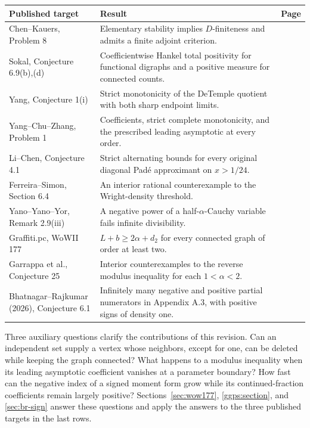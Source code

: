 \documentclass[11pt,a4paper]{article}
\theoremstyle{definition}
\theoremstyle{remark}
\numberwithin{equation}{section}
\begin{document}
\begin{center}
\small
\begin{tabular}{@{}>{\raggedright\arraybackslash}p{}>{\raggedright\arraybackslash}p{}r@{}}
\toprule
Published target & Result & Page\\
\midrule
Chen--Kauers, Problem 8 & Elementary stability implies $D$-finiteness and admits a finite adjoint criterion. & \pageref{stab:section}\\[4pt]
Sokal, Conjecture 6.9(b),(d) & Coefficientwise Hankel total positivity for functional digraphs and a positive measure for connected counts. & \pageref{sec:tp}\\[4pt]
Yang, Conjecture 1(i) & Strict monotonicity of the DeTemple quotient with both sharp endpoint limits. & \pageref{sec:yang}\\[4pt]
Yang--Chu--Zhang, Problem 1 & Coefficients, strict complete monotonicity, and the prescribed leading asymptotic at every order. & \pageref{sec:yang-allorders}\\[4pt]
Li--Chen, Conjecture 4.1 & Strict alternating bounds for every original diagonal Pad\'e approximant on $x>1/24$. & \pageref{sec:li-chen-pade}\\[4pt]
Ferreira--Simon, Section 6.4 & An interior rational counterexample to the Wright-density threshold. & \pageref{sec:wright-counterexample}\\[4pt]
Yano--Yano--Yor, Remark 2.9(iii) & A negative power of a half-$\alpha$-Cauchy variable fails infinite divisibility. & \pageref{sec:yyy}\\[4pt]
Graffiti.pc, WoWII 177 & $L+b\ge2\alpha+d_2$ for every connected graph of order at least two. & \pageref{sec:wow177}\\[4pt]
Garrappa et al., Conjecture 25 & Interior counterexamples to the reverse modulus inequality for each $1<\alpha<2$. & \pageref{ggps:section}\\[4pt]
Bhatnagar--Rajkumar (2026), Conjecture 6.1 & Infinitely many negative and positive partial numerators in Appendix A.3, with positive signs of density one. & \pageref{sec:br-sign}\\
\bottomrule
\end{tabular}
\end{center}

Three auxiliary questions clarify the contributions of this revision.
Can an independent set supply a vertex whose neighbors, except for one,
can be deleted while keeping the graph connected? What happens to a
modulus inequality when its leading asymptotic coefficient vanishes at
a parameter boundary? How fast can the negative index of a signed moment
form grow while its continued-fraction coefficients remain largely
positive? Sections~\ref{sec:wow177}, \ref{ggps:section}, and
\ref{sec:br-sign} answer these questions and apply the answers to the
three published targets in the last rows.
\end{document}
